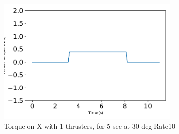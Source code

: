 \begin{figure}[htbp]\centerline{\includegraphics[width=0.8\textwidth]{AutoTeX/Torque_1Thrusters_5s_30deg_Loc0_Rate10}}\caption{Torque on X with 1 thrusters, for 5 sec at 30 deg Rate10}\label{fig:Torque_1Thrusters_5s_30deg_Loc0_Rate10}\end{figure}